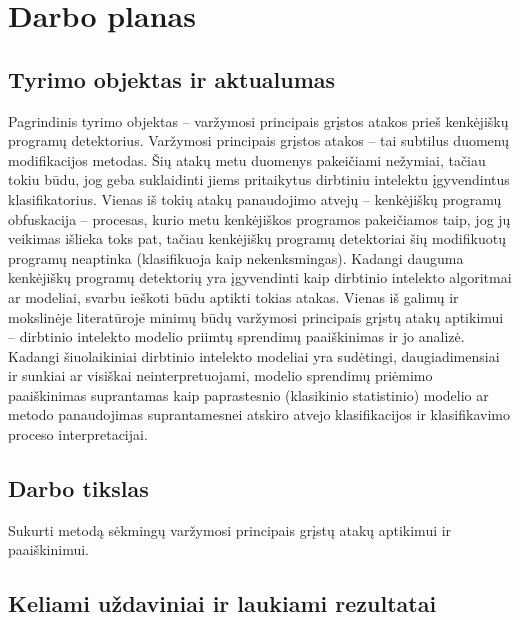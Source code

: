 \section{Darbo planas}

\subsection{Tyrimo objektas ir aktualumas}

Pagrindinis tyrimo objektas -- varžymosi principais grįstos atakos prieš
kenkėjiškų programų detektorius. Varžymosi principais grįstos atakos -- tai
subtilus duomenų modifikacijos metodas. Šių atakų metu duomenys pakeičiami
nežymiai, tačiau tokiu būdu, jog geba suklaidinti jiems pritaikytus dirbtiniu
intelektu įgyvendintus klasifikatorius. Vienas iš tokių atakų panaudojimo
atvejų -- kenkėjiškų programų obfuskacija -- procesas, kurio metu kenkėjiškos
programos pakeičiamos taip, jog jų veikimas išlieka toks pat, tačiau kenkėjiškų
programų detektoriai šių modifikuotų programų neaptinka (klasifikuoja kaip
nekenksmingas). Kadangi dauguma kenkėjiškų programų detektorių yra įgyvendinti
kaip dirbtinio intelekto algoritmai ar modeliai, svarbu ieškoti būdu aptikti
tokias atakas. Vienas iš galimų ir mokslinėje literatūroje minimų būdų
varžymosi principais grįstų atakų aptikimui -- dirbtinio intelekto modelio
priimtų sprendimų paaiškinimas ir jo analizė. Kadangi šiuolaikiniai dirbtinio
intelekto modeliai yra sudėtingi, daugiadimensiai ir sunkiai ar visiškai
neinterpretuojami, modelio sprendimų priėmimo paaiškinimas suprantamas kaip
paprastesnio (klasikinio statistinio) modelio ar metodo panaudojimas
suprantamesnei atskiro atvejo klasifikacijos ir klasifikavimo proceso
interpretacijai.

\subsection{Darbo tikslas}

Sukurti metodą sėkmingų varžymosi principais grįstų atakų aptikimui ir
paaiškinimui.

\subsection{Keliami uždaviniai ir laukiami rezultatai}

